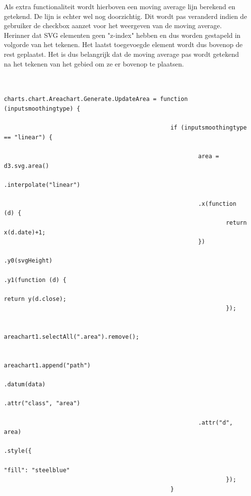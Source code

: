 Als extra functionaliteit wordt hierboven een moving average lijn berekend en getekend. De lijn is echter wel nog doorzichtig. Dit wordt pas veranderd indien de gebruiker de checkbox aanzet voor het weergeven van de moving average. Herinner dat SVG elementen geen "z-index" hebben en dus worden gestapeld in volgorde van het tekenen. Het laatst toegevoegde element wordt dus bovenop de rest geplaatst. Het is dus belangrijk dat de moving average pas wordt getekend na het tekenen van het gebied om ze er bovenop te plaatsen.

\begin{lstlisting}[gobble=28]                                             
                                                
                                        charts.chart.Areachart.Generate.UpdateArea = function (inputsmoothingtype) {
											
                                                if (inputsmoothingtype == "linear") {

                                                        area = d3.svg.area()
                                                                .interpolate("linear")

                                                        .x(function (d) {
                                                                return x(d.date)+1;
                                                        })
                                                                .y0(svgHeight)
                                                                .y1(function (d) {
                                                                        return y(d.close);
                                                                });

                                                        areachart1.selectAll(".area").remove();

                                                        areachart1.append("path")
                                                                .datum(data)
                                                                .attr("class", "area")

                                                        .attr("d", area)
                                                                .style({
                                                                        "fill": "steelblue"
                                                                });
                                                }


\end{lstlisting}
